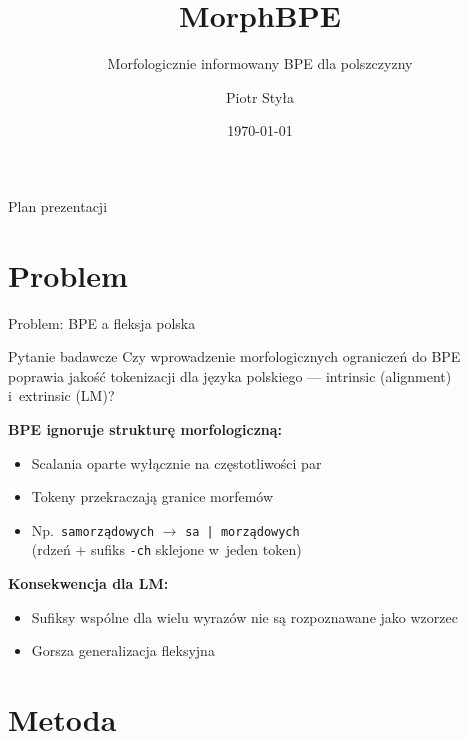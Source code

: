 \documentclass[aspectratio=169,11pt]{beamer}
\title{MorphBPE}
\subtitle{Morfologicznie informowany BPE dla polszczyzny}
\author{Piotr Styła}
\date{\today}
\begin{document}
\begin{frame}[plain]
\titlepage
\end{frame}

\begin{frame}{Plan prezentacji}
\tableofcontents
\end{frame}

\section{Problem}

\begin{frame}{Problem: BPE a fleksja polska}
\begin{block}{Pytanie badawcze}
Czy wprowadzenie morfologicznych ograniczeń do BPE poprawia jakość tokenizacji dla języka polskiego --- intrinsic (alignment) i~extrinsic (LM)?
\end{block}

\bigskip

\textbf{BPE ignoruje strukturę morfologiczną:}
\begin{itemize}
  \item Scalania oparte wyłącznie na częstotliwości par
  \item Tokeny przekraczają granice morfemów
  \item Np.\ \texttt{samorządowych} $\to$ \texttt{sa~|~morządowych} \\
        (rdzeń + sufiks \texttt{-ch} sklejone w~jeden token)
\end{itemize}

\bigskip

\textbf{Konsekwencja dla LM:}
\begin{itemize}
  \item Sufiksy wspólne dla wielu wyrazów nie są rozpoznawane jako wzorzec
  \item Gorsza generalizacja fleksyjna
\end{itemize}
\end{frame}

\section{Metoda}
\end{document}
